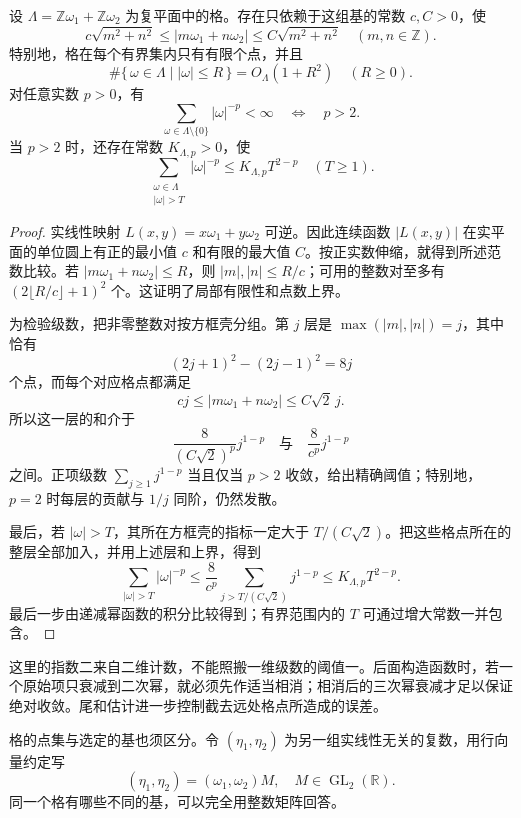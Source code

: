 \begin{proposition}\label{b3:prop:22-lattice-estimates}
设 \(\Lambda=\mathbb Z\omega_1+\mathbb Z\omega_2\) 为复平面中的格。存在只依赖于这组基的常数 \(c,C>0\)，使
\[
 c\sqrt{m^2+n^2}\le |m\omega_1+n\omega_2|
 \le C\sqrt{m^2+n^2}\quad(m,n\in\mathbb Z).
\]
特别地，格在每个有界集内只有有限个点，并且
\[
 \#\{\,\omega\in\Lambda\mid |\omega|\le R\,\}
 =O_\Lambda(1+R^2)\quad(R\ge0).
\]
对任意实数 \(p>0\)，有
\[
 \sum_{\omega\in\Lambda\setminus\{0\}}|\omega|^{-p}<\infty
 \quad\Longleftrightarrow\quad p>2.
\]
当 \(p>2\) 时，还存在常数 \(K_{\Lambda,p}>0\)，使
\[
 \sum_{\substack{\omega\in\Lambda\\|\omega|>T}}|\omega|^{-p}
 \le K_{\Lambda,p}T^{2-p}\quad(T\ge1).
\]
\end{proposition}
\begin{proof}
实线性映射 \(L(x,y)=x\omega_1+y\omega_2\) 可逆。因此连续函数 \(|L(x,y)|\) 在实平面的单位圆上有正的最小值 \(c\) 和有限的最大值 \(C\)。按正实数伸缩，就得到所述范数比较。若 \(|m\omega_1+n\omega_2|\le R\)，则 \(|m|,|n|\le R/c\)；可用的整数对至多有 \((2\lfloor R/c\rfloor+1)^2\) 个。这证明了局部有限性和点数上界。

为检验级数，把非零整数对按方框壳分组。第 \(j\) 层是 \(\max(|m|,|n|)=j\)，其中恰有
\[
 (2j+1)^2-(2j-1)^2=8j
\]
个点，而每个对应格点都满足
\[
 cj\le |m\omega_1+n\omega_2|\le C\sqrt2\,j.
\]
所以这一层的和介于
\[
 \frac{8}{(C\sqrt2)^p}j^{1-p}
 \quad\text{与}\quad
 \frac8{c^p}j^{1-p}
\]
之间。正项级数 \(\sum_{j\ge1}j^{1-p}\) 当且仅当 \(p>2\) 收敛，给出精确阈值；特别地，\(p=2\) 时每层的贡献与 \(1/j\) 同阶，仍然发散。

最后，若 \(|\omega|>T\)，其所在方框壳的指标一定大于 \(T/(C\sqrt2)\)。把这些格点所在的整层全部加入，并用上述层和上界，得到
\[
 \sum_{|\omega|>T}|\omega|^{-p}
 \le \frac8{c^p}\sum_{j>T/(C\sqrt2)}j^{1-p}
 \le K_{\Lambda,p}T^{2-p}.
\]
最后一步由递减幂函数的积分比较得到；有界范围内的 \(T\) 可通过增大常数一并包含。
\end{proof}

这里的指数二来自二维计数，不能照搬一维级数的阈值一。后面构造函数时，若一个原始项只衰减到二次幂，就必须先作适当相消；相消后的三次幂衰减才足以保证绝对收敛。尾和估计进一步控制截去远处格点所造成的误差。

\ProseParagraphBreak
格的点集与选定的基也须区分。令 \((\eta_1,\eta_2)\) 为另一组实线性无关的复数，用行向量约定写
\[
 (\eta_1,\eta_2)=(\omega_1,\omega_2)M,
 \quad M\in\operatorname{GL}_2(\mathbb R).
\]
同一个格有哪些不同的基，可以完全用整数矩阵回答。

